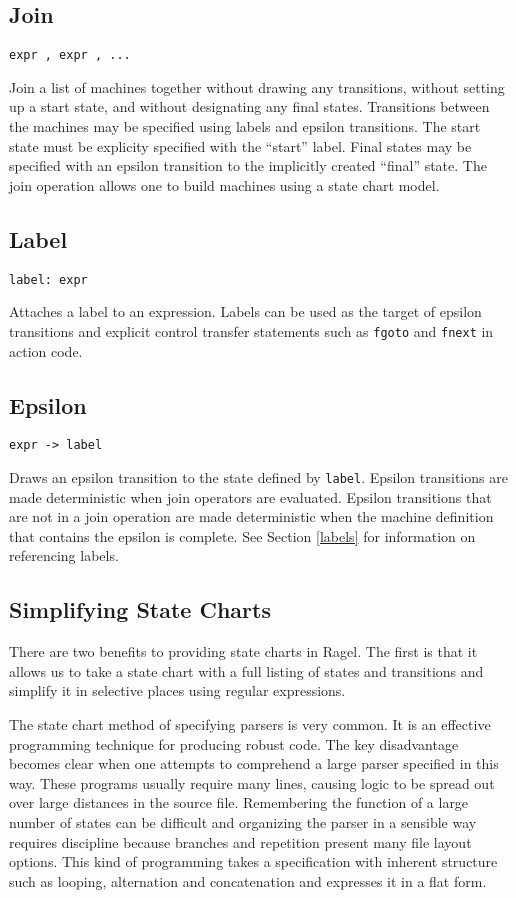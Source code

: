 \documentclass[letterpaper,11pt,oneside]{book}
\newcommand{\verbspace}{\vspace{10pt}}
\begin{document}
\subsection{Join}

\verb|expr , expr , ...|
\verbspace

Join a list of machines together without
drawing any transitions, without setting up a start state, and without
designating any final states. Transitions between the machines may be specified
using labels and epsilon transitions. The start state must be explicity
specified with the ``start'' label. Final states may be specified with an
epsilon transition to the implicitly created ``final'' state. The join
operation allows one to build machines using a state chart model.

\subsection{Label}

\verb|label: expr| 
\verbspace

Attaches a label to an expression. Labels can be
used as the target of epsilon transitions and explicit control transfer
statements such as \verb|fgoto| and \verb|fnext| in action
code.

\subsection{Epsilon}

\verb|expr -> label| 
\verbspace

Draws an epsilon transition to the state defined
by \verb|label|.  Epsilon transitions are made deterministic when join
operators are evaluated. Epsilon transitions that are not in a join operation
are made deterministic when the machine definition that contains the epsilon is
complete. See Section \ref{labels} for information on referencing labels.

\subsection{Simplifying State Charts}

There are two benefits to providing state charts in Ragel. The first is that it
allows us to take a state chart with a full listing of states and transitions
and simplify it in selective places using regular expressions.

The state chart method of specifying parsers is very common.  It is an
effective programming technique for producing robust code. The key disadvantage
becomes clear when one attempts to comprehend a large parser specified in this
way.  These programs usually require many lines, causing logic to be spread out
over large distances in the source file. Remembering the function of a large
number of states can be difficult and organizing the parser in a sensible way
requires discipline because branches and repetition present many file layout
options.  This kind of programming takes a specification with inherent
structure such as looping, alternation and concatenation and expresses it in a
flat form. 
\end{document}
